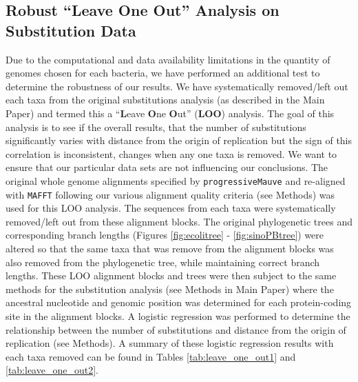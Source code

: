 \documentclass[11pt]{article}
\newcommand{\p}{\texttt{progressiveMauve}\xspace}
\begin{document}
\subsection{Robust ``Leave One Out'' Analysis on Substitution Data}
Due to the computational and data availability limitations in the quantity of genomes chosen for each bacteria, we have performed an additional test to determine the robustness of our results.
We have systematically removed/left out each taxa from the original substitutions analysis (as described in the Main Paper) and termed this a ``\textbf{L}eave \textbf{O}ne \textbf{O}ut'' (\textbf{LOO}) analysis.
The goal of this analysis is to see if the overall results, that the number of substitutions significantly varies with distance from the origin of replication but the sign of this correlation is inconsistent, changes when any one taxa is removed.
We want to ensure that our particular data sets are not influencing our conclusions.
The original whole genome alignments specified by \p and re-aligned with \texttt{MAFFT} following our various alignment quality criteria (see Methods) was used for this LOO analysis.
The sequences from each taxa were systematically removed/left out from these alignment blocks.
The original phylogenetic trees and corresponding branch lengths (Figures \ref{fig:ecolitree} - \ref{fig:sinoPBtree}) were altered so that the same taxa that was remove from the alignment blocks was also removed from the phylogenetic tree, while maintaining correct branch lengths. 
These LOO alignment blocks and trees were then subject to the same methods for the substitution analysis (see Methods in Main Paper) where the ancestral nucleotide and genomic position was determined for each protein-coding site in the alignment blocks.
A logistic regression was performed to determine the relationship between the number of substitutions and distance from the origin of replication (see Methods).
A summary of these logistic regression results with each taxa removed can be found in Tables \ref{tab:leave_one_out1} and \ref{tab:leave_one_out2}.
\end{document}
